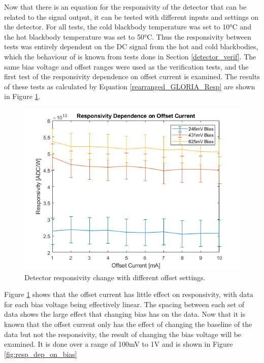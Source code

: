 Now that there is an equation for the responsivity of the detector that can be related to the signal output, it can be tested with different inputs and settings on the detector. For all tests, the cold blackbody temperature was set to 10°C and the hot blackbody temperature was set to 50°C. Thus the responsivity between tests was entirely dependent on the DC signal from the hot and cold blackbodies, which the behaviour of is known from tests done in Section \ref{detector_verif}. The same bias voltage and offset ranges were used as the verification tests, and the first test of the responsivity dependence on offset current is examined. The results of these tests as calculated by Equation \ref{rearranged_GLORIA_Resp} are shown in Figure \ref{fig:resp_dep_on_offset}.

\begin{figure}[h]
  \includegraphics[width=\linewidth]{chap6_images/verification/resp_dependence_on_offset.png}
  \caption{Detector responsivity change with different offset settings.}
  \label{fig:resp_dep_on_offset}
\end{figure}

Figure \ref{fig:resp_dep_on_offset} shows that the offset current has little effect on responsivity, with data for each bias voltage being effectively linear. The spacing between each set of data shows the large effect that changing bias has on the data. Now that it is known that the offset current only has the effect of changing the baseline of the data but not the responsivity, the result of changing the bias voltage will be examined. It is done over a range of 100mV to 1V and is shown in Figure \ref{fig:resp_dep_on_bias}

